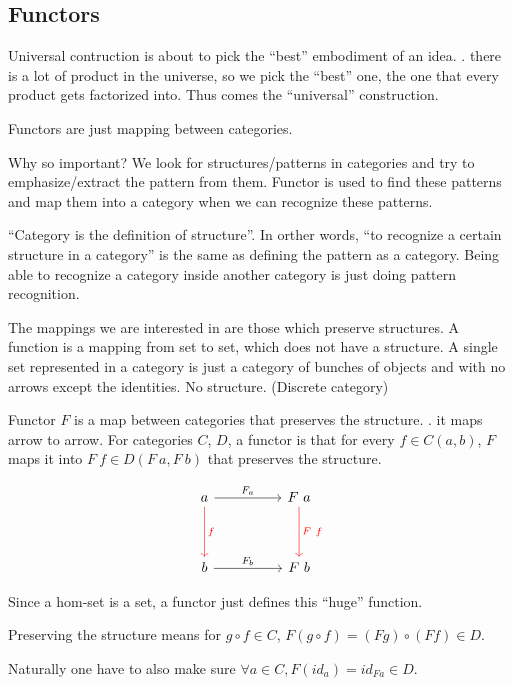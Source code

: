 \setcounter{section}{6}
\setcounter{subsection}{0}
\subsection{Functors}

Universal contruction is about to pick the ``best'' embodiment of an idea. \eg.
there is a lot of product in the universe, so we pick the ``best'' one, the one
that every product gets factorized into. Thus comes the ``universal''
construction.

Functors are just mapping between categories.

Why so important? We look for structures/patterns in categories and try to
emphasize/extract the pattern from them. Functor is used to find these patterns
and map them into a category when we can recognize these patterns.

``Category is the definition of structure''. In orther words, ``to recognize a
certain structure in a category'' is the same as defining the pattern as a
category. Being able to recognize a category inside another category is just
doing pattern recognition.

The mappings we are interested in are those which preserve structures. A
function is a mapping from set to set, which does not have a structure. A single
set represented in a category is just a category of bunches of objects and with
no arrows except the identities. No structure. (Discrete category)
\\

\begin{definition}{Functor}
  $F$ is a map between categories that preserves the structure.
  \ie. it maps arrow to arrow.
  For categories $C$, $D$, a functor is that for every
  $f \in C(a, b)$, $F$ maps it into $F~f \in D(F~a, F~b)$ that preserves the
  structure.

\[
\begin{tikzcd}[sep=huge]
  a \rar{F_a} \dar[red]{f} & F~a \dar[red]{F~f} \\
  b \rar{F_b} & F~b
\end{tikzcd}
\]

  Since a hom-set is a set, a functor just defines this ``huge'' function.

  Preserving the structure means for $g \circ f \in C$, $F (g \circ f) = (F g)
  \circ (F f) \in D$.

  Naturally one have to also make sure
  $\forall a \in C, F(id_a) = id_{F a} \in D$.
\end{definition}

